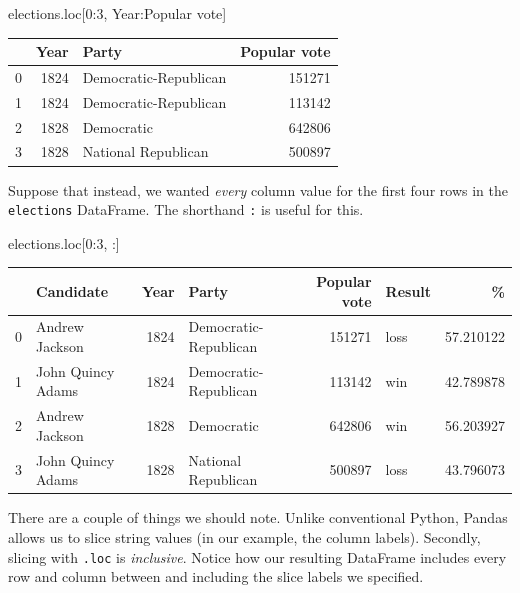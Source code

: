 \documentclass[
  letterpaper,
  DIV=11,
  numbers=noendperiod]{scrreprt}
\newenvironment{Shaded}{\begin{snugshade}}{\end{snugshade}}
\newcommand{\DecValTok}[1]{\textcolor[rgb]{0.68,0.00,0.00}{#1}}
\newcommand{\NormalTok}[1]{\textcolor[rgb]{0.00,0.23,0.31}{#1}}
\newcommand{\StringTok}[1]{\textcolor[rgb]{0.13,0.47,0.30}{#1}}
\begin{document}
\begin{Shaded}
\begin{Highlighting}[]
\NormalTok{elections.loc[}\DecValTok{0}\NormalTok{:}\DecValTok{3}\NormalTok{, }\StringTok{\textquotesingle{}Year\textquotesingle{}}\NormalTok{:}\StringTok{\textquotesingle{}Popular vote\textquotesingle{}}\NormalTok{]}
\end{Highlighting}
\end{Shaded}

\begin{tabular}{lrlr}
\toprule
{} &  Year &                  Party &  Popular vote \\
\midrule
0 &  1824 &  Democratic-Republican &        151271 \\
1 &  1824 &  Democratic-Republican &        113142 \\
2 &  1828 &             Democratic &        642806 \\
3 &  1828 &    National Republican &        500897 \\
\bottomrule
\end{tabular}

Suppose that instead, we wanted \emph{every} column value for the first
four rows in the \texttt{elections} DataFrame. The shorthand \texttt{:}
is useful for this.

\begin{Shaded}
\begin{Highlighting}[]
\NormalTok{elections.loc[}\DecValTok{0}\NormalTok{:}\DecValTok{3}\NormalTok{, :]}
\end{Highlighting}
\end{Shaded}

\begin{tabular}{llrlrlr}
\toprule
{} &          Candidate &  Year &                  Party &  Popular vote & Result &          \% \\
\midrule
0 &     Andrew Jackson &  1824 &  Democratic-Republican &        151271 &   loss &  57.210122 \\
1 &  John Quincy Adams &  1824 &  Democratic-Republican &        113142 &    win &  42.789878 \\
2 &     Andrew Jackson &  1828 &             Democratic &        642806 &    win &  56.203927 \\
3 &  John Quincy Adams &  1828 &    National Republican &        500897 &   loss &  43.796073 \\
\bottomrule
\end{tabular}

There are a couple of things we should note. Unlike conventional Python,
Pandas allows us to slice string values (in our example, the column
labels). Secondly, slicing with \texttt{.loc} is \emph{inclusive}.
Notice how our resulting DataFrame includes every row and column between
and including the slice labels we specified.
\end{document}
